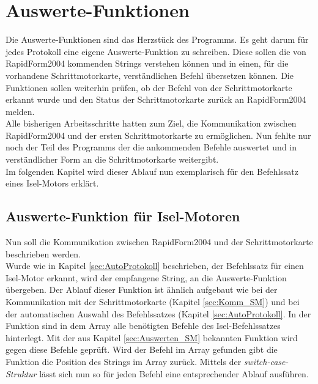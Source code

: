 \lstset{language=C, basicstyle=\footnotesize, showstringspaces=false, tabsize=8}


\lstset{language=C, basicstyle=\footnotesize, showstringspaces=false, tabsize=8}


\section{Auswerte-Funktionen}
\label{sec:Auswerten_RF}
Die Auswerte-Funktionen sind das Herzstück des Programms. Es geht darum für jedes Protokoll eine eigene Auswerte-Funktion zu schreiben. Diese sollen die von RapidForm2004 kommenden Strings verstehen können und in einen, für die vorhandene Schrittmotorkarte, verständlichen Befehl übersetzen können. Die Funktionen sollen weiterhin prüfen, ob der Befehl von der Schrittmotorkarte erkannt wurde und den Status der Schrittmotorkarte zurück an RapidForm2004 melden.\\
Alle bisherigen Arbeitsschritte hatten zum Ziel, die Kommunikation zwischen RapidForm2004 und der ersten Schrittmotorkarte zu ermöglichen. Nun fehlte nur noch der Teil des Programms der die ankommenden Befehle auswertet und in verständlicher Form an die Schrittmotorkarte weitergibt.\\
Im folgenden Kapitel wird dieser Ablauf nun exemplarisch für den Befehlssatz eines Isel-Motors erklärt.

\subsection{Auswerte-Funktion für Isel-Motoren}
Nun soll die Kommunikation zwischen RapidForm2004 und der Schrittmotorkarte beschrieben werden.\\
Wurde wie in Kapitel \ref{sec:AutoProtokoll} beschrieben, der Befehlssatz für einen Isel-Motor erkannt, wird der empfangene String, an die Auswerte-Funktion  übergeben. Der Ablauf dieser Funktion ist ähnlich aufgebaut wie bei der Kommunikation mit der Schrittmotorkarte (Kapitel \ref{sec:Komm_SM}) und bei der automatischen Auswahl des Befehlssatzes (Kapitel \ref{sec:AutoProtokoll}. In der Funktion  sind in dem Array  alle benötigten Befehle des Isel-Befehlssatzes hinterlegt. Mit der aus Kapitel \ref{sec:Auswerten_SM} bekannten Funktion  wird   gegen diese Befehle geprüft. Wird der Befehl im Array gefunden gibt die Funktion  die Position des Strings im Array zurück. Mittels der \emph{switch-case-Struktur} lässt sich nun so für jeden Befehl eine entsprechender Ablauf ausführen. 

